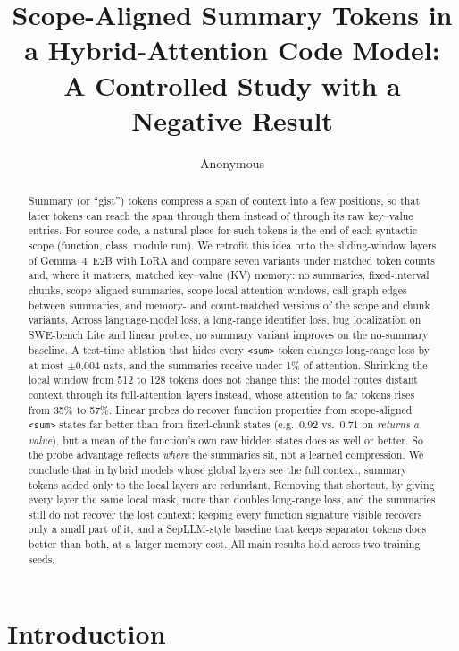 \documentclass[11pt]{article}
\title{Scope-Aligned Summary Tokens in a Hybrid-Attention Code Model:\\
A Controlled Study with a Negative Result}
\author{Anonymous}
\date{}
\newcommand{\sumtok}{\texttt{<sum>}}
\begin{document}
\maketitle

\begin{abstract}
Summary (or ``gist'') tokens compress a span of context into a few positions,
so that later tokens can reach the span through them instead of through its
raw key--value entries. For source code, a natural place for such tokens is
the end of each syntactic scope (function, class, module run). We retrofit
this idea onto the sliding-window layers of Gemma~4~E2B with LoRA and compare
seven variants under matched token counts and, where it matters, matched
key--value (KV) memory: no summaries, fixed-interval chunks, scope-aligned
summaries, scope-local attention windows, call-graph edges between summaries,
and memory- and count-matched versions of the scope and chunk variants.
Across language-model loss, a long-range identifier loss, bug localization on
SWE-bench Lite and linear probes, no summary variant improves on the
no-summary baseline. A test-time ablation that hides every \sumtok{} token
changes long-range loss by at most $\pm 0.004$ nats, and the summaries receive
under 1\% of attention. Shrinking the local window from 512 to 128 tokens does
not change this: the model routes distant context through its full-attention
layers instead, whose attention to far tokens rises from 35\% to 57\%.
Linear probes do recover function properties from scope-aligned \sumtok{}
states far better than from fixed-chunk states (e.g.\ 0.92 vs.\ 0.71 on
\emph{returns a value}), but a mean of the function's own raw hidden states
does as well or better. So the probe advantage reflects \emph{where} the
summaries sit, not a learned compression. We conclude that in hybrid models
whose global layers see the full context, summary tokens added only to the
local layers are redundant. Removing that shortcut, by giving every layer the
same local mask, more than doubles long-range loss, and the summaries still do
not recover the lost context; keeping every function signature visible
recovers only a small part of it, and a SepLLM-style baseline that keeps
separator tokens does better than both, at a larger memory cost. All main
results hold across two training seeds.
\end{abstract}

\section{Introduction}
\end{document}
